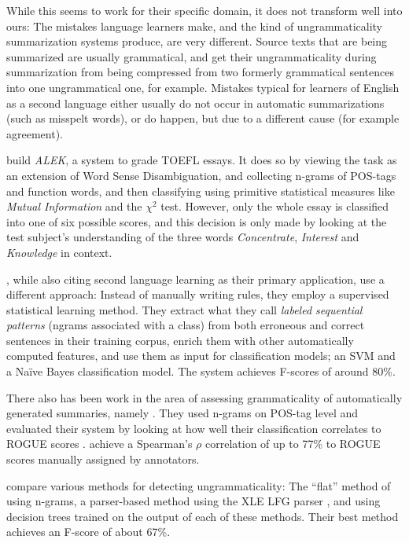 \documentclass[a4paper,10pt]{scrartcl}
\theoremstyle{style}
\begin{document}
While this seems to work for their specific domain, it does not transform well into ours: The mistakes language learners make, and the kind of ungrammaticality summarization systems produce, are very different. Source texts that are being summarized are usually grammatical, and get their ungrammaticality during summarization from being compressed from two formerly grammatical sentences into one ungrammatical one, for example. Mistakes typical for learners of English as a second language either usually do not occur in automatic summarizations (such as misspelt words), or do happen, but due to a different cause (for example agreement).

\cite{chodorow2000unsupervised} build \textit{ALEK}, a system to grade TOEFL essays. It does so by viewing the task as an extension of Word Sense Disambiguation, and collecting n-grams of POS-tags and function words, and then classifying using primitive statistical measures like \textit{Mutual Information} and the $\chi^2$ test. However, only the whole essay is classified into one of six possible scores, and this decision is only made by looking at the test subject's understanding of the three words \textit{Concentrate}, \textit{Interest} and \textit{Knowledge} in context.

\cite{sun2007detecting}, while also citing second language learning as their primary application, use a different approach: Instead of manually writing rules, they employ a supervised statistical learning method. They extract what they call \textit{labeled sequential patterns} (ngrams associated with a class) from both erroneous and correct sentences in their training corpus, enrich them with other automatically computed features, and use them as input for classification models; an SVM \citep[SVMlight,][]{Joachims/02a} and a Na\"ive Bayes classification model. The system achieves F-scores of around 80\%.

There also has been work in the area of assessing grammaticality of automatically generated summaries, namely \cite{vadlapudi2010automated}. They used n-grams on POS-tag level and evaluated their system by looking at how well their classification correlates to ROGUE scores \citep{lin2004rouge}. \citeauthor{vadlapudi2010automated} achieve a Spearman's $\rho{}$ correlation of up to 77\% to ROGUE scores manually assigned by annotators.

\cite{wagner2007comparative} compare various methods for detecting ungrammaticality: The ``flat'' method of using n-grams, a parser-based method using the XLE LFG parser \citep{maxwell1996efficient}, and using decision trees trained on the output of each of these methods. Their best method achieves an F-score of about 67\%.
\end{document}

